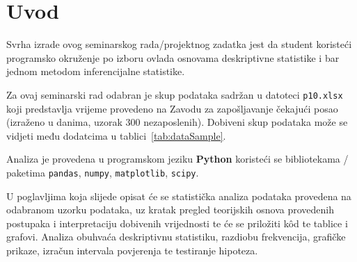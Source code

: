 \section{Uvod}

Svrha izrade ovog seminarskog rada/projektnog zadatka jest da student koristeći
programsko okruženje po izboru ovlada osnovama deskriptivne statistike i bar jednom metodom inferencijalne statistike.

Za ovaj seminarski rad odabran je skup podataka sadržan u datoteci \texttt{p10.xlsx} koji predstavlja vrijeme provedeno na Zavodu za zapošljavanje čekajući posao (izraženo u danima, uzorak 300 nezaposlenih). Dobiveni skup podataka može se vidjeti među dodatcima u tablici~\ref{tab:dataSample}.

Analiza je provedena u programskom jeziku \textbf{Python} koristeći se bibliotekama / paketima \texttt{pandas}, \texttt{numpy}, \texttt{matplotlib}, \texttt{scipy}.

U poglavljima koja slijede opisat će se statistička analiza podataka provedena na odabranom uzorku podataka, uz kratak pregled teorijskih osnova provedenih postupaka i interpretaciju dobivenih vrijednosti te će se priložiti k\^od te tablice i grafovi. Analiza obuhvaća deskriptivnu statistiku, razdiobu frekvencija, grafičke prikaze, izračun intervala povjerenja te testiranje hipoteza.